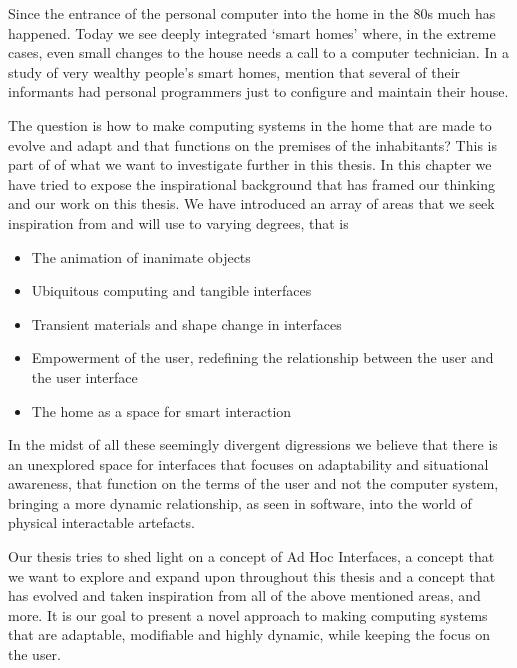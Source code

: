 Since the entrance of the personal computer into the home in the 80s much has happened.
Today we see deeply integrated `smart homes' where, in the extreme cases, even small changes to the house needs a call to a computer technician.
In a study of very wealthy people's smart homes, \citet{lynggaard2012had} mention that several of their informants had personal programmers just to configure and maintain their house.

The question is how to make computing systems in the home that are made to evolve and adapt and that functions on the premises of the inhabitants? This is part of of what we want to investigate further in this thesis.  
\blank
In this chapter we have tried to expose the inspirational background that has framed our thinking and our work on this thesis. 
We have introduced an array of areas that we seek inspiration from and will use to varying degrees, that is

\begin{itemize}
\item{The animation of inanimate objects}
\item{Ubiquitous computing and tangible interfaces}
\item{Transient materials and shape change in interfaces}
\item{Empowerment of the user, redefining the relationship between the user and the user interface}
\item{The home as a space for smart interaction}
\end{itemize}

In the midst of all these seemingly divergent digressions we believe that there is an unexplored space for interfaces that focuses on adaptability and situational awareness, that function on the terms of the user and not the computer system, bringing a more dynamic relationship, as seen in software, into the world of physical interactable artefacts.

Our thesis tries to shed light on a concept of Ad Hoc Interfaces, a concept that we want to explore and expand upon throughout this thesis and a concept that has evolved and taken inspiration from all of the above mentioned areas, and more. 
It is our goal to present a novel approach to making computing systems that are adaptable, modifiable and highly dynamic, while keeping the focus on the user. 